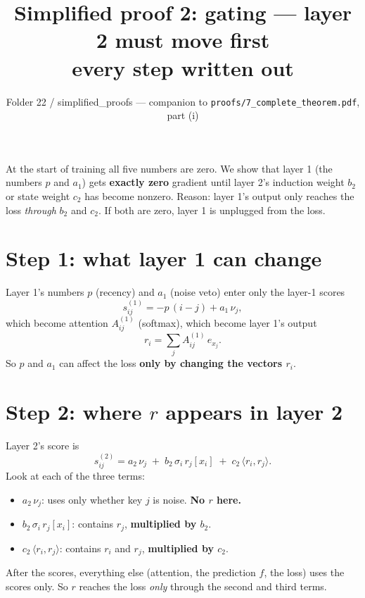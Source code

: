 \documentclass[11pt]{article}
\title{Simplified proof 2: gating --- layer 2 must move first\\[4pt]\large every step written out}
\author{Folder 22 / simplified\_proofs --- companion to \texttt{proofs/7\_complete\_theorem.pdf}, part (i)}
\date{}
\begin{document}
\maketitle

\begin{idea}
At the start of training all five numbers are zero. We show that layer 1 (the numbers $p$ and $a_1$)
gets \textbf{exactly zero} gradient until layer 2's induction weight $b_2$ or state weight $c_2$ has
become nonzero. Reason: layer 1's output only reaches the loss \emph{through} $b_2$ and $c_2$. If
both are zero, layer 1 is unplugged from the loss.
\end{idea}

\section{Step 1: what layer 1 can change}
Layer 1's numbers $p$ (recency) and $a_1$ (noise veto) enter only the layer-1 scores
\[
s^{(1)}_{ij}=-p\,(i-j)+a_1\,\nu_j ,
\]
which become attention $A^{(1)}_{ij}$ (softmax), which become layer 1's output
\[
r_i=\sum_jA^{(1)}_{ij}\,e_{x_j}.
\]
So $p$ and $a_1$ can affect the loss \textbf{only by changing the vectors $r_i$}.

\section{Step 2: where $r$ appears in layer 2}
Layer 2's score is
\[
s^{(2)}_{ij}=a_2\,\nu_j\;+\;b_2\,\sigma_i\,r_j[x_i]\;+\;c_2\,\langle r_i,r_j\rangle .
\]
Look at each of the three terms:
\begin{itemize}
\item $a_2\,\nu_j$: uses only whether key $j$ is noise. \textbf{No $r$ here.}
\item $b_2\,\sigma_i\,r_j[x_i]$: contains $r_j$, \textbf{multiplied by $b_2$}.
\item $c_2\,\langle r_i,r_j\rangle$: contains $r_i$ and $r_j$, \textbf{multiplied by $c_2$}.
\end{itemize}
After the scores, everything else (attention, the prediction $f$, the loss) uses the scores only. So
$r$ reaches the loss \emph{only} through the second and third terms.
\end{document}

